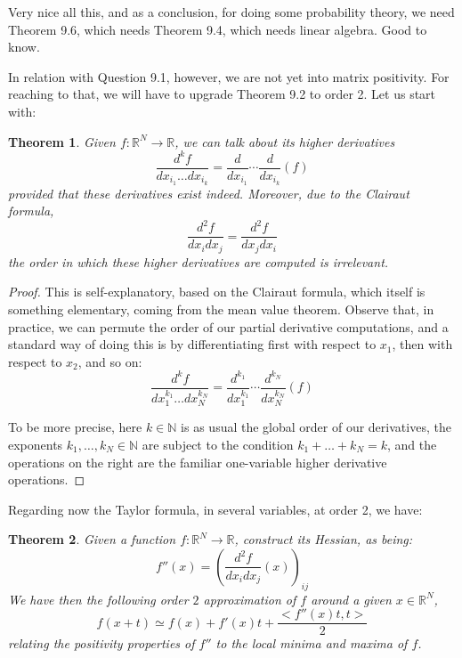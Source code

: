 \documentclass[12pt]{amsbook}
\newtheorem{theorem}{Theorem}[chapter]
\begin{document}
Very nice all this, and as a conclusion, for doing some probability theory, we need Theorem 9.6, which needs Theorem 9.4, which needs linear algebra. Good to know.

\bigskip

In relation with Question 9.1, however, we are not yet into matrix positivity. For reaching to that, we will have to upgrade Theorem 9.2 to order 2. Let us start with:


\begin{theorem}
Given $f:\mathbb R^N\to\mathbb R$, we can talk about its higher derivatives
$$\frac{d^kf}{dx_{i_1}\ldots dx_{i_k}}=\frac{d}{dx_{i_1}}\cdots\frac{d}{dx_{i_k}}(f)$$
provided that these derivatives exist indeed. Moreover, due to the Clairaut formula,
$$\frac{d^2f}{dx_idx_j}=\frac{d^2f}{dx_jdx_i}$$
the order in which these higher derivatives are computed is irrelevant.
\end{theorem}

\begin{proof}
This is self-explanatory, based on the Clairaut formula, which itself is something elementary, coming from the mean value theorem. Observe that, in practice, we can permute the order of our partial derivative computations, and a standard way of doing this is by differentiating first with respect to $x_1$, then with respect to $x_2$, and so on:
$$\frac{d^kf}{dx_1^{k_1}\ldots dx_N^{k_N}}=\frac{d^{k_1}}{dx_1^{k_1}}\cdots\frac{d^{k_N}}{dx_N^{k_N}}(f)$$

To be more precise, here $k\in\mathbb N$ is as usual the global order of our derivatives, the exponents $k_1,\ldots,k_N\in\mathbb N$ are subject to the condition $k_1+\ldots+k_N=k$, and the operations on the right are the familiar one-variable higher derivative operations.
\end{proof}

Regarding now the Taylor formula, in several variables, at order 2, we have:


\begin{theorem}
Given a function $f:\mathbb R^N\to\mathbb R$, construct its Hessian, as being:
$$f''(x)=\left(\frac{d^2f}{dx_idx_j}(x)\right)_{ij}$$ 
We have then the following order $2$ approximation of $f$ around a given $x\in\mathbb R^N$,
$$f(x+t)\simeq f(x)+f'(x)t+\frac{<f''(x)t,t>}{2}$$
relating the positivity properties of $f''$ to the local minima and maxima of $f$.
\end{theorem}
\end{document}
